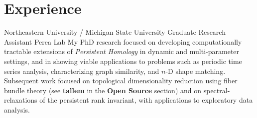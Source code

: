 \documentclass[11pt,a4paper,sans]{moderncv} %
\begin{document}

%


\section{Experience}

			 {Northeastern University / Michigan State University}
			 {Graduate Research Assistant}
			 {Perea Lab}{}{\vspace{3pt}
			 My PhD research focused on developing computationally tractable extensions of \emph{Persistent Homology} in dynamic and multi-parameter settings, and in showing viable applications to problems such as periodic time series analysis, characterizing graph similarity, and $n$-D shape matching. 
			 Subsequent work focused on topological dimensionality reduction using fiber bundle theory (see \textbf{tallem} in the \textbf{Open Source} section) and on spectral-relaxations of the persistent rank invariant, with applications to exploratory data analysis.
			}
\vspace{0.75em}
\end{document}
